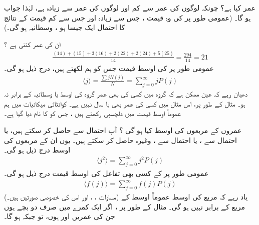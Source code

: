  \quad  
  عمر کیا ہے؟ 
 \quad 
چونکہ  لوگوں کی عمر  سے کم اور  لوگوں کی عمر  سے زیادہ ہے،  لہٰذا جواب  ہو گا۔ (عمومی طور پر   کی وہ قیمت  ، جس سے زیادہ اور جس سے کم قیمت کے نتائج کا احتمال ایک جیسا  ہو ، وسطانیہ ہو گی۔)

 \quad 
ان کی  عمر کتنی ہے ؟
 \quad 
\begin{align*}
 \frac{(14)+(15)+3(16)+2(22)+2(24)+5(25)}{14} = \frac{294}{14}=21 
\end{align*}
عمومی طور پر  کی اوسط قیمت جس کو ہم  لکھتے ہیں، درج ذیل ہو گی۔ 
\begin{align}\label{مساوات_تفاعل_موج_اوسط}
\langle j \rangle = \frac{\sum j N(j)}{N} = \sum_{j=0}^{\infty} jP(j) 
\end{align}
دھیان رہے کہ عین ممکن ہے کہ گروہ میں کسی کی بھی عمر گروہ کی اوسط یا وسطانیہ کے برابر نہ ہو۔ مثال کے طور پر، اس مثال میں کسی کی عمر بھی  یا  سال نہیں ہے۔ کوانٹائی میکانیات میں ہم عموماً اوسط قیمت میں دلچسپی رکھتے ہیں ، جس کو  کا نام دیا گیا ہے۔ 

 \quad 
 عمروں کے مربعوں کی اوسط کیا ہو گی ؟ 
 \quad 
آپ  احتمال سے  حاصل کر سکتے ہیں، یا  احتمال سے ، یا  احتمال سے ، وغیرہ حاصل کر سکتے ہیں۔  یوں ان کے مربعوں کی اوسط درج ذیل ہو گی۔ 
\begin{align}\label{مساوات_تفاعل_موج_اوسط_مربع}
\langle j^{2} \rangle = \sum_{j=0}^{\infty} j^{2} P(j) 
\end{align}
عمومی طور پر  کے کسی بھی تفاعل کی اوسط قیمت درج ذیل ہو گی۔ 
\begin{align}
 \langle f(j) \rangle = \sum_{j=0}^{\infty} f(j) P(j) 
\end{align}
(مساوات ،  ، اور  اس کی خصوصی صورتیں ہیں۔) یاد رہے کہ مربع کی اوسط  عموماً اوسط کے مربع  کے برابر نہیں ہو گی۔ مثال کے طور پر ، اگر ایک کمرے میں صرف دو بچے ہوں جن کی عمریں اور ہوں،  تو        جبکہ     ہو گا۔

